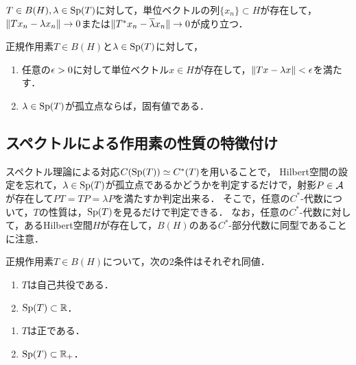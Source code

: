 \documentclass[uplatex,dvipdfmx]{jsreport}
\begin{document}
\begin{lemma}
    $T\in B(H),\lambda\in\mathrm{Sp}(T)$に対して，単位ベクトルの列$\{x_n\}\subset H$が存在して，$\|Tx_n-\lambda x_n\|\to0$または$\|T^*x_n-\overline{\lambda}x_n\|\to0$が成り立つ．
\end{lemma}

\begin{proposition}
    正規作用素$T\in B(H)$と$\lambda\in\mathrm{Sp}(T)$に対して，
    \begin{enumerate}
        \item 任意の$\epsilon>0$に対して単位ベクトル$x\in H$が存在して，$\|Tx-\lambda x\|<\epsilon$を満たす．
        \item $\lambda\in\mathrm{Sp}(T)$が孤立点ならば，固有値である．
    \end{enumerate}
\end{proposition}

\subsection{スペクトルによる作用素の性質の特徴付け}

\begin{tcolorbox}[colframe=ForestGreen, colback=ForestGreen!10!white,breakable,colbacktitle=ForestGreen!40!white,coltitle=black,fonttitle=\bfseries\sffamily,
title=]
    スペクトル理論による対応$C(\mathrm{Sp}(T))\simeq C^*(T)$を用いることで，
    Hilbert空間の設定を忘れて，$\lambda\in\mathrm{Sp}(T)$が孤立点であるかどうかを判定するだけで，射影$P\in\mathcal{A}$が存在して$PT=TP=\lambda P$を満たすか判定出来る．
    そこで，任意の$C^*$-代数について，$T$の性質は，$\mathrm{Sp}(T)$を見るだけで判定できる．
    なお，任意の$C^*$-代数に対して，あるHilbert空間$H$が存在して，$B(H)$のある$C^*$-部分代数に同型であることに注意．
\end{tcolorbox}

\begin{proposition}
    正規作用素$T\in B(H)$について，次の2条件はそれぞれ同値．
    \begin{enumerate}
        \item $T$は自己共役である．
        \item $\mathrm{Sp}(T)\subset\mathbb{R}$．
    \end{enumerate}
    \begin{enumerate}
        \item $T$は正である．
        \item $\mathrm{Sp}(T)\subset\mathbb{R}_+$．
    \end{enumerate}
\end{proposition}
\end{document}
